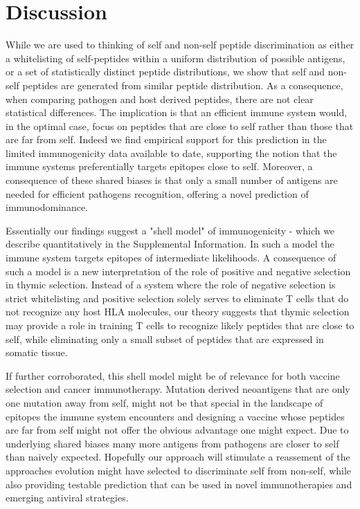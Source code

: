 \documentclass[superscriptaddress,twocolumn,pre]{revtex4}
\newcommand{\<}{\langle}
\renewcommand{\>}{\rangle}
\begin{document}
\section{Discussion}

While we are used to thinking of self and non-self peptide discrimination as either a whitelisting of self-peptides within a uniform distribution of possible antigens, or a set of statistically distinct peptide distributions, we show that self and non-self peptides are generated from similar peptide distribution. As a consequence, when comparing pathogen and host derived peptides, there are not clear statistical differences. The implication is that an efficient immune system would, in the optimal case, focus on peptides that are close to self rather than those that are far from self. Indeed we find empirical support for this prediction in the limited immunogenicity data available to date, supporting the notion that the immune systems preferentially targets epitopes close to self. Moreover, a consequence of these shared biases is that only a small number of antigens are needed for efficient pathogens recognition, offering a novel prediction of immunodominance.

Essentially our findings suggest a "shell model" of immunogenicity - which we describe quantitatively in the Supplemental Information. In such a model the immune system targets epitopes of intermediate likelihoods. A consequence of such a model is a new interpretation of the role of positive and negative selection in thymic selection. Instead of a system where the role of negative selection is strict whitelisting and positive selection solely serves to eliminate T cells that do not recognize any host HLA molecules, our theory suggests that thymic selection may provide a role in training T cells to recognize likely peptides that are close to self, while eliminating only a small subset of peptides that are expressed in somatic tissue.

If further corroborated, this shell model might be of relevance for both vaccine selection and cancer immunotherapy. Mutation derived neoantigens that are only one mutation away from self, might not be that special in the landscape of epitopes the immune system encounters and designing a vaccine whose peptides are far from self might not offer the obvious advantage one might expect. Due to underlying shared biases many more antigens from pathogens are closer to self than naively expected. Hopefully our approach will stimulate a reassement of the approaches evolution might have selected to discriminate self from non-self, while also providing testable prediction that can be used in novel immunotherapies and emerging antiviral strategies.
\end{document}
